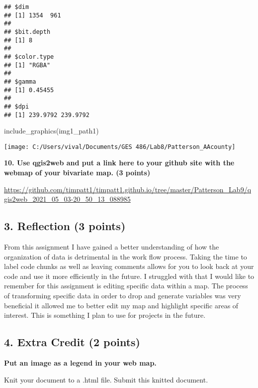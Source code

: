 \documentclass[
]{article}
\newenvironment{Shaded}{\begin{snugshade}}{\end{snugshade}}
\newcommand{\FunctionTok}[1]{\textcolor[rgb]{0.00,0.00,0.00}{#1}}
\newcommand{\NormalTok}[1]{#1}
\begin{document}
\begin{verbatim}
## $dim
## [1] 1354  961
## 
## $bit.depth
## [1] 8
## 
## $color.type
## [1] "RGBA"
## 
## $gamma
## [1] 0.45455
## 
## $dpi
## [1] 239.9792 239.9792
\end{verbatim}

\begin{Shaded}
\begin{Highlighting}[]
\FunctionTok{include\_graphics}\NormalTok{(img1\_path1)}
\end{Highlighting}
\end{Shaded}

\texttt{[image: C:/Users/vival/Documents/GES 486/Lab8/Patterson\_AAcounty]}

\textbf{10. Use qgis2web and put a link here to your github site with
the webmap of your bivariate map. (3 points)}

\url{https://github.com/timpatt1/timpatt1.github.io/tree/master/Patterson_Lab9/qgis2web_2021_05_03-20_50_13_088985}

\hypertarget{reflection-3-points}{%
\subsection{3. Reflection (3 points)}\label{reflection-3-points}}

From this assignment I have gained a better understanding of how the
organization of data is detrimental in the work flow process. Taking the
time to label code chunks as well as leaving comments allows for you to
look back at your code and use it more efficiently in the future. I
struggled with that I would like to remember for this assignment is
editing specific data within a map. The process of transforming specific
data in order to drop and generate variables was very beneficial it
allowed me to better edit my map and highlight specific areas of
interest. This is something I plan to use for projects in the future.

\hypertarget{extra-credit-2-points}{%
\subsection{4. Extra Credit (2 points)}\label{extra-credit-2-points}}

\textbf{Put an image as a legend in your web map.}

Knit your document to a .html file. Submit this knitted document.
\end{document}

